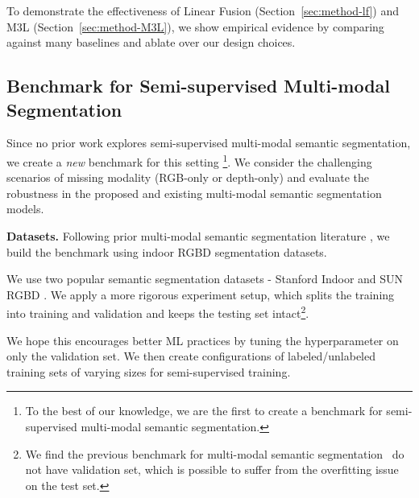 \documentclass[10pt,twocolumn,letterpaper]{article}
\begin{document}
\begin{table*}[h]
\label{tab:ablation-M3L}
\end{table*} \begin{table}[t]
\centering
{}
\caption{\small{Validation mean IoU to tune fusion weight on Stanford Indoor dataset with 0.2\% labels.}}
\vspace{-3mm}
\label{tab:alphatune}
\end{table} 

To demonstrate the effectiveness of Linear Fusion (Section~\ref{sec:method-lf}) and M3L (Section~\ref{sec:method-M3L}), we show empirical evidence by comparing against many baselines and ablate over our design choices.
\subsection{Benchmark for Semi-supervised Multi-modal Segmentation}
Since no prior work explores semi-supervised multi-modal semantic segmentation, we create a \textit{new} benchmark for this setting
\footnote{To the best of our knowledge, we are the first to create a benchmark for semi-supervised multi-modal semantic segmentation.}. We consider the challenging scenarios of missing modality (RGB-only or depth-only) and evaluate the robustness in the proposed and existing multi-modal semantic segmentation models.\newline

\noindent\textbf{Datasets.} Following prior multi-modal semantic segmentation literature \cite{tokenfusion, ssma}, we build the benchmark using indoor RGBD segmentation datasets.

We use two popular semantic segmentation datasets - Stanford Indoor \cite{stanfordindoor} and SUN RGBD \cite{sunrgbd}. 
We apply a more rigorous experiment setup, which splits the training into training and validation and keeps the testing set intact\footnote{We find the previous benchmark for multi-modal semantic segmentation~\cite{tokenfusion, ssma, cen, shapeconv} do not have validation set, which is possible to suffer from the overfitting issue on the test set.}.

We hope this encourages better ML practices by tuning the hyperparameter on only the validation set. 
We then create configurations of labeled/unlabeled training sets of varying sizes for semi-supervised training. 
\end{document}
